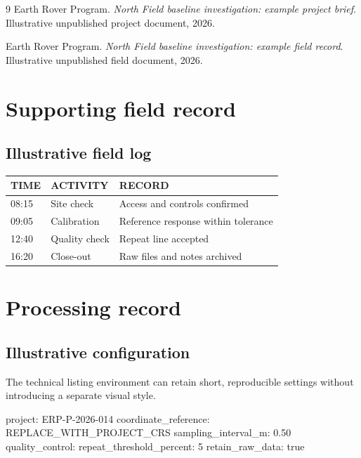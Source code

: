 \documentclass{erp-report}
\begin{document}
\reportbackmatter
{}
\begin{thebibliography}{9}
  Earth Rover Program.
  \emph{North Field baseline investigation: example project brief}.
  Illustrative unpublished project document, 2026.

  Earth Rover Program.
  \emph{North Field baseline investigation: example field record}.
  Illustrative unpublished field document, 2026.
\end{thebibliography}

\appendix
\chapter{Supporting field record}

\section{Illustrative field log}
\lipsum[18]

\begin{reporttable}
  \caption{Example field activity record.}
  \label{tab:field-log}
  \begin{tabularx}{\textwidth}{@{}p{24mm}p{30mm}X@{}}
    \toprule
    \textcolor{ERPTopSoil}{\MakeUppercase{Time}} &
    \textcolor{ERPTopSoil}{\MakeUppercase{Activity}} &
    \textcolor{ERPTopSoil}{\MakeUppercase{Record}} \\
    \midrule
    08:15 & Site check & Access and controls confirmed \\
    09:05 & Calibration & Reference response within tolerance \\
    12:40 & Quality check & Repeat line accepted \\
    16:20 & Close-out & Raw files and notes archived \\
    \bottomrule
  \end{tabularx}
\end{reporttable}

\chapter{Processing record}
\section{Illustrative configuration}
The technical listing environment can retain short, reproducible settings
without introducing a separate visual style.

\begin{technicalcode}
project: ERP-P-2026-014
coordinate_reference: REPLACE_WITH_PROJECT_CRS
sampling_interval_m: 0.50
quality_control:
  repeat_threshold_percent: 5
  retain_raw_data: true
\end{technicalcode}

\lipsum[19]
\end{document}
